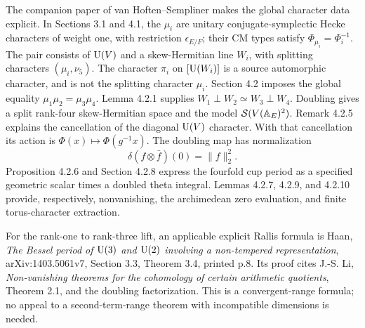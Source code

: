 \documentclass[11pt]{article}
\theoremstyle{definition}\newtheorem{definition}[theorem]{Definition}\newtheorem{remark}[theorem]{Remark}
\begin{document}
The companion paper of van Hoften--Sempliner makes the global character
data explicit. In Sections 3.1 and 4.1, the $\mu_i$ are unitary
conjugate-symplectic Hecke characters of weight one, with restriction
$\epsilon_{E/F}$; their CM types satisfy
$\Phi_{\mu_i}=\Phi_i^{-1}$. The pair consists of $\operatorname{U}(V)$ and a
skew-Hermitian line $W_i$, with splitting characters $(\mu_i,\nu_5)$.
The character $\pi_i$ on $[\operatorname{U}(W_i)]$ is a source automorphic character,
and is not the splitting character $\mu_i$. Section 4.2 imposes the
global equality $\mu_1\mu_2=\mu_3\mu_4$. Lemma 4.2.1 supplies
$W_1\perp W_2\simeq W_3\perp W_4$. Doubling gives a split rank-four
skew-Hermitian space and the model $\mathcal S(V(\mathbb A_E)^2)$.
Remark 4.2.5 explains the cancellation of the diagonal $\operatorname{U}(V)$ character.
With that cancellation its action is $\Phi(x)\mapsto\Phi(g^{-1}x)$.
The doubling map has normalization
\[
 \delta(f\otimes\bar f)(0)=\|f\|_2^2.
\]
Proposition 4.2.6 and Section 4.2.8 express the fourfold cup period as a
specified geometric scalar times a doubled theta integral. Lemmas
4.2.7, 4.2.9, and 4.2.10 provide, respectively, nonvanishing, the
archimedean zero evaluation, and finite torus-character extraction.

For the rank-one to rank-three lift, an applicable explicit Rallis
formula is Haan, \emph{The Bessel period of $\operatorname{U}(3)$ and $\operatorname{U}(2)$ involving
a non-tempered representation}, arXiv:1403.5061v7, Section 3.3,
Theorem 3.4, printed p.8. Its proof cites J.-S. Li, \emph{Non-vanishing
theorems for the cohomology of certain arithmetic quotients}, Theorem
2.1, and the doubling factorization. This is a convergent-range
formula; no appeal to a second-term-range theorem with incompatible
dimensions is needed.
\end{document}
